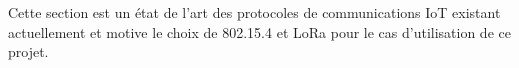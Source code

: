 Cette section est un état de l'art des protocoles de communications IoT existant actuellement
et motive le choix de 802.15.4 et LoRa pour le cas d'utilisation de ce projet.


